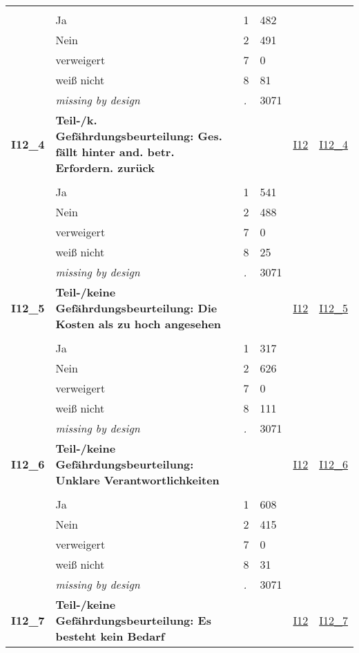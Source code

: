 \begin{longtable}{| L{2.45cm} | L{6cm} | C{1.5cm} | R{1cm} | C{2.25cm} | C{2.25cm} |}
   &  &  &  &  &  \\ 
   & Ja & 1 & 482 &  &  \\ 
   & Nein & 2 & 491 &  &  \\ 
   & verweigert & 7 & 0 &  &  \\ 
   & weiß nicht & 8 & 81 &  &  \\ 
   & \textit{missing by design} & \textit{.} & 3071 &  &  \\ 
   \midrule
\textbf{I12\_4}\label{var:I12:4} & \textbf{Teil-/k. Gefährdungsbeurteilung: Ges. fällt hinter and. betr. Erfordern. zurück} &  &  & \hyperref[I12]{I12} & \hyperref[var:suf:I12:4]{I12\_4} \\ 
   &  &  &  &  &  \\ 
   & Ja & 1 & 541 &  &  \\ 
   & Nein & 2 & 488 &  &  \\ 
   & verweigert & 7 & 0 &  &  \\ 
   & weiß nicht & 8 & 25 &  &  \\ 
   & \textit{missing by design} & \textit{.} & 3071 &  &  \\ 
   \midrule
\textbf{I12\_5}\label{var:I12:5} & \textbf{Teil-/keine Gefährdungsbeurteilung: Die Kosten als zu hoch angesehen} &  &  & \hyperref[I12]{I12} & \hyperref[var:suf:I12:5]{I12\_5} \\ 
   &  &  &  &  &  \\ 
   & Ja & 1 & 317 &  &  \\ 
   & Nein & 2 & 626 &  &  \\ 
   & verweigert & 7 & 0 &  &  \\ 
   & weiß nicht & 8 & 111 &  &  \\ 
   & \textit{missing by design} & \textit{.} & 3071 &  &  \\ 
   \midrule
\textbf{I12\_6}\label{var:I12:6} & \textbf{Teil-/keine Gefährdungsbeurteilung: Unklare Verantwortlichkeiten} &  &  & \hyperref[I12]{I12} & \hyperref[var:suf:I12:6]{I12\_6} \\ 
   &  &  &  &  &  \\ 
   & Ja & 1 & 608 &  &  \\ 
   & Nein & 2 & 415 &  &  \\ 
   & verweigert & 7 & 0 &  &  \\ 
   & weiß nicht & 8 & 31 &  &  \\ 
   & \textit{missing by design} & \textit{.} & 3071 &  &  \\ 
   \midrule
\textbf{I12\_7}\label{var:I12:7} & \textbf{Teil-/keine Gefährdungsbeurteilung: Es besteht kein Bedarf} &  &  & \hyperref[I12]{I12} & \hyperref[var:suf:I12:7]{I12\_7} \\ 

\end{longtable}
